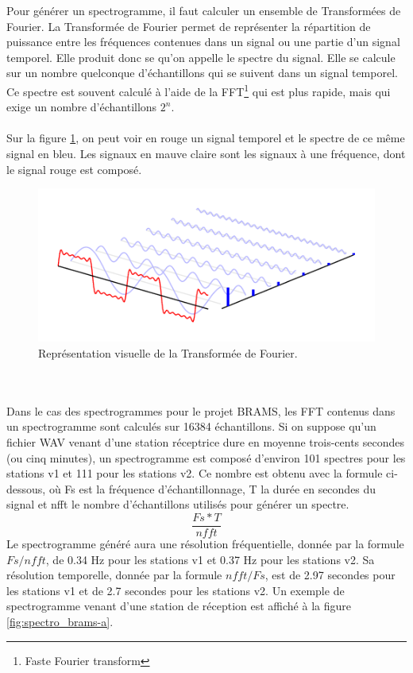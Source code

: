 \documentclass[11pt]{article}
\begin{document}
Pour générer un spectrogramme, il faut calculer un ensemble de Transformées de Fourier.
La Transformée de Fourier permet de représenter la répartition de puissance entre les fréquences contenues dans un signal ou une partie d'un signal temporel.
Elle produit donc se qu'on appelle le spectre du signal.
Elle se calcule sur un nombre quelconque d'échantillons qui se suivent dans un signal temporel.
Ce spectre est souvent calculé à l'aide de la FFT\footnote{Faste Fourier transform} qui est plus rapide, mais qui exige un nombre d'échantillons $2^{n}$.\\
\\
Sur la figure \ref{fig:expl_fourier}, on peut voir en rouge un signal temporel et le spectre de ce même signal en bleu.
Les signaux en mauve claire sont les signaux à une fréquence, dont le signal rouge est composé.
\begin{figure}[t]
    \begin{center}
        \includegraphics[scale=0.7]{spectre.png}
        \caption{Représentation visuelle de la Transformée de Fourier.}
        \label{fig:expl_fourier}
    \end{center}
\end{figure}
\\
\\
Dans le cas des spectrogrammes pour le projet BRAMS, les FFT contenus dans un spectrogramme sont calculés sur 16384 échantillons.
Si on suppose qu'un fichier WAV venant d'une station réceptrice dure en moyenne trois-cents secondes (ou cinq minutes), un spectrogramme est composé d'environ 101 spectres pour les stations v1 et 111 pour les stations v2.
Ce nombre est obtenu avec la formule ci-dessous, où Fs est la fréquence d'échantillonnage, T la durée en secondes du signal et nfft le nombre d'échantillons utilisés pour générer un spectre.
\[\frac{Fs * T}{nfft}\]
Le spectrogramme généré aura une résolution fréquentielle, donnée par la formule \(Fs / nfft\), de 0.34 Hz pour les stations v1 et 0.37 Hz pour les stations v2.
Sa résolution temporelle, donnée par la formule \(nfft / Fs\), est de 2.97 secondes pour les stations v1 et de 2.7 secondes pour les stations v2.
Un exemple de spectrogramme venant d'une station de réception est affiché à la figure \ref{fig:spectro_brams-a}.
\end{document}
